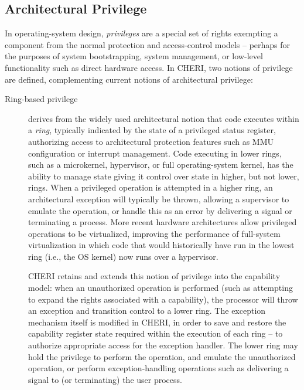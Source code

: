 \subsection{Architectural Privilege}

In operating-system design, {\em privileges} are a special set of rights
exempting a component from the normal protection and access-control models --
perhaps for the purposes of system bootstrapping, system management, or
low-level functionality such as direct hardware access.
In CHERI, two notions of privilege are defined, complementing current
notions of architectural privilege:

\begin{description}

\item[Ring-based privilege] derives from the widely used architectural notion
  that code executes within a \textit{ring}, typically indicated by the state
  of a privileged status register, authorizing access to architectural protection
  features such as MMU configuration or interrupt management.
  Code executing in lower rings, such as a microkernel, hypervisor, or full
  operating-system kernel, has the ability to manage state giving it control
  over state in higher, but not lower, rings.
  When a privileged operation is attempted in a higher ring, an architectural
  exception will typically be thrown, allowing a supervisor to emulate the
  operation, or handle this as an error by delivering a signal or terminating
  a process.
  More recent hardware architectures allow privileged operations to be
  virtualized, improving the performance of full-system virtualization in
  which code that would historically have run in the lowest ring (i.e., the OS
  kernel) now runs over a hypervisor.

  CHERI retains and extends this notion of privilege into the capability
  model: when an unauthorized operation is performed (such as attempting to
  expand the rights associated with a capability), the processor will throw an
  exception and transition control to a lower ring.
  The exception mechanism itself is modified in CHERI, in order to save and
  restore the capability register state required within the execution of each
  ring -- to authorize appropriate access for the exception handler.
  The lower ring may hold the privilege to perform the operation, and emulate
  the unauthorized operation, or perform exception-handling operations such
  as delivering a signal to (or terminating) the user process.


\end{description}
